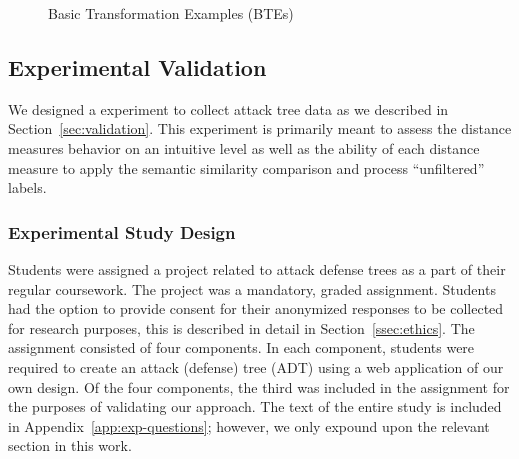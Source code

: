 \begin{figure}
\begin{subfigure}[b]{\CEWidth}
        \resizebox{2cm}{!}{
            
        }
        \label{fig:b}
    \end{subfigure}
\begin{subfigure}[b]{\CEWidth}
        \centering
        \resizebox{2cm}{!}{
            
        }
        \label{fig:b}
    \end{subfigure}
\begin{subfigure}[b]{\CEWidth}
        \centering
        \resizebox{2cm}{!}{
            
        }
        \label{fig:b}
    \end{subfigure}
\begin{subfigure}[b]{\CEWidth}
        \centering
        \resizebox{2cm}{!}{
            
        }
        \label{fig:b}
    \end{subfigure}
\begin{subfigure}[b]{\CEWidth}
        \centering
        \resizebox{1.8cm}{!}{
            
        }
        \label{fig:b}
    \end{subfigure}
\caption{Basic Transformation Examples (BTEs)}\label{fig:counterexamples}
\end{figure}





\subsection{Experimental Validation}

We designed a experiment to collect attack tree data as we described in Section~\ref{sec:validation}. This experiment is primarily meant to assess the distance measures behavior on an intuitive level as well as the ability of each distance measure to apply the semantic similarity comparison and process ``unfiltered'' labels.

\subsubsection{Experimental Study Design}
\label{ssec:method-study-design}

Students were assigned a project related to attack defense trees as a part of their regular coursework. The project was a mandatory, graded assignment. Students had the option to provide consent for their anonymized responses to be collected for research purposes, this is described in detail in Section~\ref{ssec:ethics}. The assignment consisted of four components. In each component, students were required to create an attack (defense) tree (ADT) using a web application of our own design. Of the four components, the third was included in the assignment for the purposes of validating our approach. The text of the entire study is included in Appendix~\ref{app:exp-questions}; however, we only expound upon the relevant section in this work.

